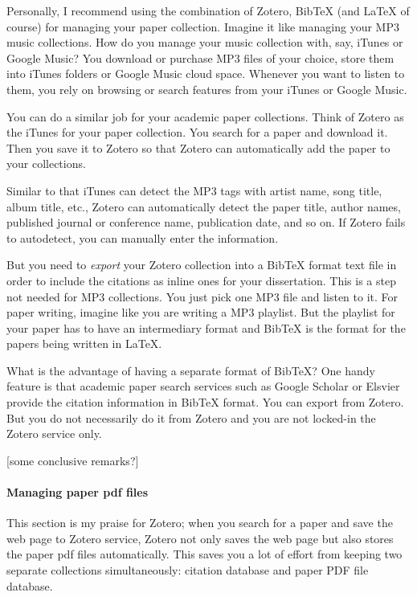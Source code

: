 \documentclass[11pt]{article}
\begin{document}
Personally, I recommend using the combination of Zotero, BibTeX (and LaTeX of
course) for managing your paper collection. Imagine it like managing your MP3
music collections. How do you manage your music collection with, say, iTunes
or Google Music? You download or purchase MP3 files of your choice, store them
into iTunes folders or Google Music cloud space. Whenever you want to listen
to them, you rely on browsing or search features from your iTunes or Google
Music.

You can do a similar job for your academic paper collections. Think of
Zotero as the iTunes for your paper collection. You search for a paper and
download it. Then you save it to Zotero so that Zotero can automatically add
the paper to your collections. 

Similar to that iTunes can detect the MP3 tags with artist name, song title,
album title, etc., Zotero can automatically detect the paper title, author
names, published journal or conference name, publication date, and so on. If
Zotero fails to autodetect, you can manually enter the information.

But you need to \emph{export} your Zotero collection into a BibTeX format
text file in order to include the citations as inline ones for your
dissertation. This is a step not needed for MP3 collections. You just pick one
MP3 file and listen to it. For paper writing, imagine like you are writing a
MP3 playlist. But the playlist for your paper has to have an intermediary
format and BibTeX is the format for the papers being written in LaTeX.

What is the advantage of having a separate format of BibTeX? One handy feature is
that academic paper search services such as Google Scholar or Elsvier provide
the citation information in BibTeX format. You can export from Zotero. But you
do not necessarily do it from Zotero and you are not locked-in the Zotero
service only. 

[some conclusive remarks?]

\paragraph{Managing paper pdf files}
This section is my praise for Zotero; when you search for a paper and
save the web page to Zotero service, Zotero not only saves the web page
but also stores the paper pdf files automatically. This saves you a lot
of effort from keeping two separate collections simultaneously: citation
database and paper PDF file database.
\end{document}
